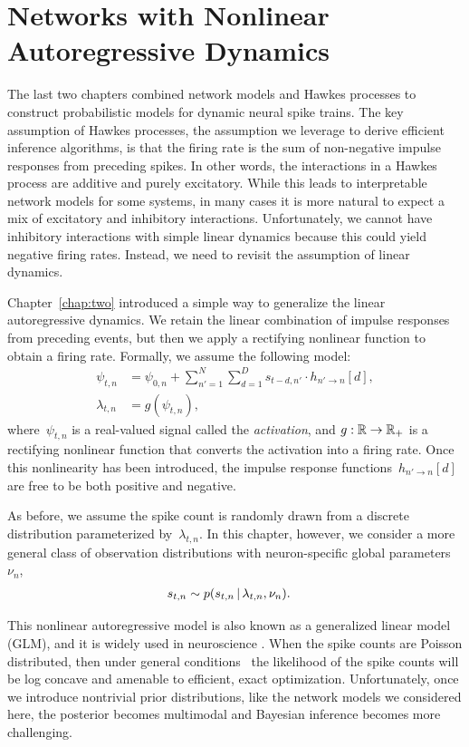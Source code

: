 
\chapter{Networks with Nonlinear Autoregressive Dynamics}
\label{chap:five}

The last two chapters combined network models and Hawkes processes to
construct probabilistic models for dynamic neural spike trains. The
key assumption of Hawkes processes, the assumption we leverage to
derive efficient inference algorithms, is that the firing rate is the
sum of non-negative impulse responses from preceding spikes. In other
words, the interactions in a Hawkes process are additive and purely
excitatory. While this leads to interpretable network models for some
systems, in many cases it is more natural to expect a mix of
excitatory and inhibitory interactions. Unfortunately, we cannot have
inhibitory interactions with simple linear dynamics because this could
yield negative firing rates. Instead, we need to revisit the
assumption of linear dynamics.

Chapter~\ref{chap:two} introduced a simple way to generalize the
linear autoregressive dynamics. We retain the linear combination of
impulse responses from preceding events, but then we apply a
rectifying nonlinear function to obtain a firing rate.  Formally, we
assume the following model:
\begin{align*}
  \psi_{t,n}
  &= \psi_{0,n} + \sum_{n'=1}^N \sum_{d=1}^{D} s_{t-d, n'} \cdot h_{n' \to n}[d], \\
  \lambda_{t,n} &= g(\psi_{t,n}),
\end{align*}
where~$\psi_{t,n}$ is a real-valued signal called the
\emph{activation}, and ${g: \mathbb{R} \to \mathbb{R}_+}$ is a rectifying
nonlinear function that converts the activation into a firing rate.
Once this nonlinearity has been introduced, the impulse response
functions~$h_{n' \to n}[d]$ are free to be both positive and negative.

As before, we assume the spike count is randomly drawn from a discrete
distribution parameterized by~$\lambda_{t,n}$. In this chapter, however,
we consider a more general class of observation distributions with
neuron-specific global parameters~$\nu_n$,
\begin{align*}
  s_{t,n} &\sim p(s_{t,n} \,|\, \lambda_{t,n}, \nu_n).
\end{align*}

This nonlinear autoregressive model is also known as a generalized
linear model (GLM), and it is widely used in neuroscience
\citep{Paninski-2004, Truccolo-2005, Pillow-2008}. When the spike
counts are Poisson distributed, then under general
conditions~\citep{Paninski-2004} the likelihood of the spike counts
will be log concave and amenable to efficient, exact
optimization. Unfortunately, once we introduce nontrivial prior
distributions, like the network models we considered here, the
posterior becomes multimodal and Bayesian inference becomes more
challenging.


